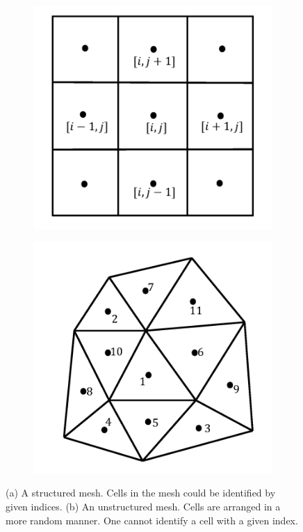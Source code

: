 \begin{figure}
  \centering
  \begin{subfigure}{0.5\linewidth}
    \centering
    \includegraphics[width=0.8\linewidth]{img/intro/mStructured.png}
    \caption{}
    \label{fig-structured-ij}
  \end{subfigure}%
  \begin{subfigure}{0.5\linewidth}
    \centering
    \includegraphics[width=0.8\linewidth]{img/intro/mUnstructured.png}
    \caption{}
    \label{fig-unstructured}
  \end{subfigure}%
  \caption[Structured and Unstructured meshes]{(a) A structured mesh. Cells in the mesh could be identified by given indices. (b) An unstructured mesh. Cells are arranged in a more random manner. One cannot identify a cell with a given index.}
  \label{fig-structured-unstructured}
\end{figure}

